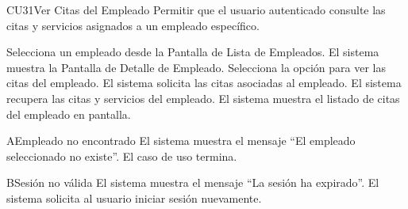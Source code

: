 ﻿%

\begin{UseCase}{CU31}{Ver Citas del Empleado}{
	Permitir que el usuario autenticado consulte las citas y servicios asignados a un empleado específico.
}
\end{UseCase}

\begin{UCtrayectoria}
	\UCpaso[\UCactor] Selecciona un empleado desde la Pantalla de Lista de Empleados.
	\UCpaso El sistema muestra la Pantalla de Detalle de Empleado.
	\UCpaso[\UCactor] Selecciona la opción para ver las citas del empleado.
	\UCpaso El sistema solicita las citas asociadas al empleado.
	\UCpaso El sistema recupera las citas y servicios del empleado.
	\UCpaso El sistema muestra el listado de citas del empleado en pantalla.
\end{UCtrayectoria}

\begin{UCtrayectoriaA}{A}{Empleado no encontrado}
	\UCpaso El sistema muestra el mensaje ``El empleado seleccionado no existe''.
	\UCpaso El caso de uso termina.
\end{UCtrayectoriaA}

\begin{UCtrayectoriaA}{B}{Sesión no válida}
	\UCpaso El sistema muestra el mensaje ``La sesión ha expirado''.
	\UCpaso El sistema solicita al usuario iniciar sesión nuevamente.
\end{UCtrayectoriaA}

